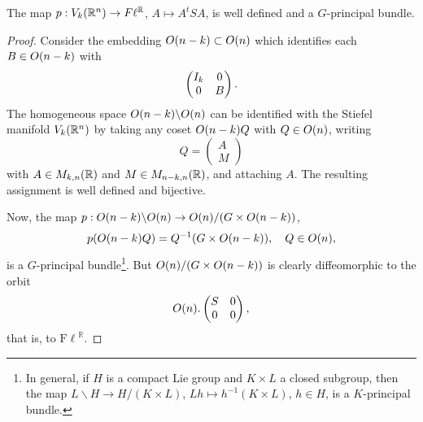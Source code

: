 \documentclass[10pt,a4paper]{amsart}
\newcommand{\Fl}{{\mathrm{F\ell}}}
\newcommand{\RR}{\mathbb R}
\begin{document}
\begin{lem} \label{gbundle}
 The map $p:{\rm V}_k(\RR^n) \to {\rm F}\ell^\RR$, $A\mapsto A^tSA$, is well defined and a $G$-principal bundle.
\end{lem}

\begin{proof} 
Consider the embedding ${\rm O}(n-k)\subset {\rm O}(n)$ which identifies each $B\in {\rm O}(n-k)$ with
$$\begin{pmatrix}
{\rm I}_k & 0  \\
0 & B 
\end{pmatrix}. $$
The homogeneous space ${\rm O}(n-k)\backslash {\rm O}(n)$ can be identified with the Stiefel manifold ${\rm V}_k(\RR^n)$ by taking any coset ${\rm O}(n-k)Q$ with $Q\in {\rm O}(n)$, writing
$$Q=\begin{pmatrix}
A  \\
M 
\end{pmatrix}
$$
with $A\in {\rm M}_{k,n}(\RR)$ and $M \in {\rm M}_{n-k, n}(\RR)$, and attaching $A$. The resulting assignment is well defined and bijective.

Now, the map $p: {\rm O}(n-k)\backslash {\rm O}(n) \to {\rm O}(n)/(G \times {\rm O}(n-k))$,
$$p({\rm O}(n-k)Q)=Q^{-1}(G\times {\rm O}(n-k)), \quad Q\in {\rm O}(n),$$
is a $G$-principal bundle\footnote{In general, if $H$ is a compact Lie group and $K\times L$ a closed subgroup, then the map
$L\backslash H \to H/(K\times L)$, $Lh \mapsto h^{-1}(K\times L)$, $h\in H$, is a $K$-principal bundle.}.
But ${\rm O}(n)/(G \times {\rm O}(n-k))$ is clearly diffeomorphic to the orbit
$${\rm O}(n).\begin{pmatrix}
S& 0  \\
0 & 0 
\end{pmatrix},$$
that is, to $\Fl^\RR$. 


\end{proof}
\end{document}
